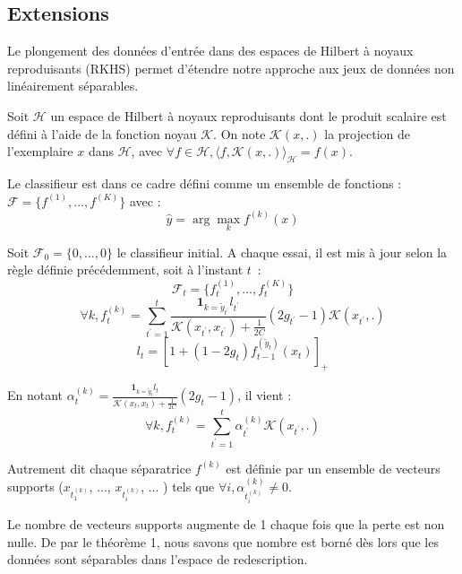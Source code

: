 \documentclass[twocolumn]{article}
\begin{document}
\subsection{Extensions}
Le plongement des données d'entrée dans des espaces de Hilbert à noyaux reproduisants (RKHS) permet d'étendre notre approche aux jeux de données non linéairement séparables. 

Soit $\mathcal{H}$ un espace de Hilbert à noyaux reproduisants dont le produit scalaire est défini à l'aide de la fonction noyau $\mathcal{K}$. On note $\mathcal{K}(x,.)$ la projection de l'exemplaire $x$ dans $\mathcal{H}$, avec $\forall f \in \mathcal{H}, \langle f,\mathcal{K}(x,.)\rangle_\mathcal{H} = f(x) $.
 

Le classifieur est dans ce cadre défini comme un ensemble de fonctions : $\mathcal{F} = \{f^{(1)}, ..., f^{(K)}\}$ avec :
$$\hat{y} = \arg \max_k f^{(k)}(x)$$

Soit $\mathcal{F}_0=\{0, ..., 0\}$ le classifieur initial. A chaque essai, il est mis à jour selon la règle définie précédemment, soit à l'instant $t$~:
$$\mathcal{F}_t = \{f^{(1)}_t, ..., f^{(K)}_t\}$$
$$\forall k, f^{(k)}_t = \sum_{t^\prime = 1} ^t  \frac {\mathbf{1}_{k=\tilde{y}_{t^\prime}}l_{t^\prime}}{\mathcal{K}(x_{t^\prime},x_{t^\prime})+\frac{1}{2C}} (2g_{t^\prime} - 1)\mathcal{K}(x_{t^\prime},.)$$
$$ l_t = [1 + (1-2g_t) f_{t-1}^{(\tilde{y}_t)}(x_t)]_+$$

En notant $\alpha_t^{(k)} = \frac {\mathbf{1}_{k=\tilde{y}_{t}}l_{t}}{\mathcal{K}(x_{t},x_{t})+\frac{1}{2C}} (2g_{t} - 1)$, il vient :
$$\forall k, f^{(k)}_t = \sum_{t^\prime = 1} ^t \alpha_{t^\prime}^{(k)} \mathcal{K}(x_{t^\prime},.)$$

Autrement dit chaque séparatrice $f^{(k)}$ est définie par un ensemble de vecteurs supports ($x_{t_1^{(k)}}$, ..., $x_{t_i^{(k)}}$, ...  ) tels que $\forall i, \alpha_{t_i^{(k)}}^{(k)} \neq 0$.


Le nombre de vecteurs supports augmente de 1 chaque fois que la perte est non nulle. De par le théorème 1, nous savons que nombre est borné dès lors que les données sont séparables dans l'espace de redescription. 
\end{document}
